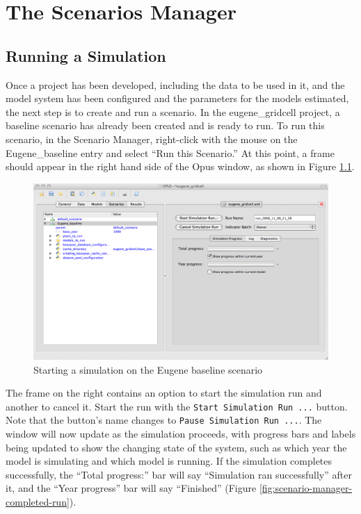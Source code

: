 \chapter{The Scenarios Manager}
\label{chap:scenarios-manager}

\section{Running a Simulation}

Once a project has been developed, including the data to be used in it, and
the model system has been configured and the parameters for the models
estimated, the next step is to create and run a scenario.  In the
eugene\_gridcell project, a baseline scenario has already been created and
is ready to run.  To run this scenario, in the 
Scenario Manager,
right-click with the mouse on the Eugene\_baseline entry and select
``Run this Scenario.''  At this point, a frame should appear in the
right hand side of the Opus window, as shown in Figure
\ref{fig:scenario-manager-start-run}.

\begin{figure}[htp]
\begin{center}
\includegraphics[scale=0.4]{part-gui/images/scenario-manager-start-run.png}
\end{center}
\caption{Starting a simulation on the Eugene baseline scenario}
\label{fig:scenario-manager-start-run}
\end{figure}

The frame on the right contains an option to start the simulation run and
another to cancel it.  Start the run with the
\verb#Start Simulation Run ...# button.  Note that the button's name
changes to \verb#Pause Simulation Run ...#.  The window will now update as
the simulation proceeds, with progress bars and labels being updated to
show the changing state of the system, such as which year the model is
simulating and which model is running.  If the simulation completes
successfully, the ``Total progress:'' bar will say ``Simulation ran
successfully'' after it, and the ``Year progress'' bar will say
``Finished'' (Figure \ref{fig:scenario-manager-completed-run}).

